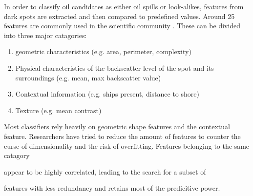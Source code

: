 In order to classify oil candidates as either oil spills or look-alikes, features from dark spots are extracted and then compared to predefined values. Around 25 features are commonly used in the scientific community \cite{Topouzelis200930}. These can be divided into three major catagories\cite{Brekke200595}:
\begin{enumerate}
\item geometric characteristics (e.g. area, perimeter, complexity)
\item Physical characteristics of the backscatter level of the spot and its surroundings (e.g. mean, max backscatter value)
\item Contextual information (e.g. ships present, distance to shore)
\item Texture (e.g. mean contrast)
\end{enumerate}
Most classifiers rely heavily on geometric shape features and the contextual feature.\cite{Xu201414} Researchers have tried to reduce the amount of features to counter the curse of dimensionality and the risk of overfitting. Features belonging to the same catagory 

appear to be highly correlated\cite{Xu201414}, leading to the search for a subset of 

features with less redundancy and retains most of the predicitive power\cite{Topouzelis200930}. 
